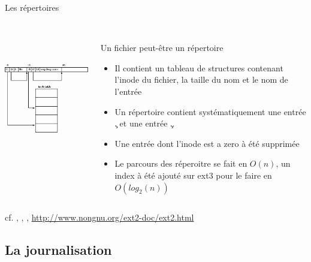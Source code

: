 \begin{frame}[fragile=singleslide]{Les répertoires}
  \begin{columns}
    \begin{column}{4.5cm}
      \includegraphics[height=6cm]{pics/img88}
    \end{column}
    \begin{column}{6.5cm}
      \\[3em]
      Un fichier peut-être un répertoire
      \begin{itemize}
      \item Il contient un  tableau de structures contenant l'inode du
        fichier, la taille du nom et le nom de l'entrée
      \item Un  répertoire contient systématiquement  une entrée \c{.}
        et une entrée \c{..}
      \item Une entrée dont l'inode est a zero à été supprimée
      \item Le parcours  des réperoitre se fait en  $O(n)$, un index à
        été ajouté sur ext3 pour le faire en $O(log_2(n))$
      \end{itemize}
    \end{column}
  \end{columns}

  cf.   ,  ,  ,
    \url{http://www.nongnu.org/ext2-doc/ext2.html}
\end{frame}

\subsection{La journalisation}

